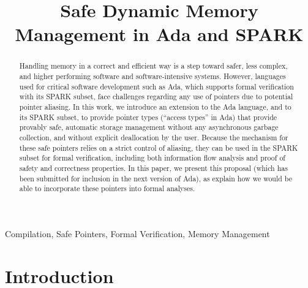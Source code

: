 \documentclass{llncs}
\begin{document}

\title{Safe Dynamic Memory Management in Ada and SPARK}

\maketitle
\begin{abstract}
Handling memory in a correct and efficient way is a step toward safer, less complex, and higher performing software and software-intensive systems. However, languages used for critical software development such as Ada, which supports formal verification with its SPARK subset, face challenges regarding any use of pointers due to potential pointer aliasing. In this work, we introduce an extension to the Ada language, and to its SPARK subset, to provide pointer types (``access types'' in Ada) that provide provably safe, automatic storage management without any asynchronous garbage collection, and without explicit deallocation by the user. Because the mechanism for these safe pointers relies on a strict control of aliasing, they can be used in the SPARK subset for formal verification, including both information flow analysis and proof of safety and correctness properties. In this paper, we present this proposal (which has been submitted for inclusion in the next version of Ada), as explain
how we would be able to incorporate these pointers into formal analyses.
\end{abstract}



\keywords 

Compilation, Safe Pointers, Formal Verification, Memory Management


\section{Introduction}
\end{document}

